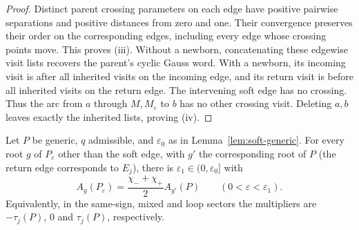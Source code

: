 \begin{proof}
Distinct parent crossing parameters on each edge have positive
pairwise separations and positive distances from zero and one.
Their convergence preserves their order on the corresponding
edges, including every edge whose crossing points move.
This proves (iii). Without a newborn, concatenating these
edgewise visit lists recovers the parent's cyclic Gauss word.
With a newborn, its incoming visit is after all inherited visits
on the incoming edge, and its return visit is before all inherited
visits on the return edge. The intervening soft edge has no crossing.
Thus the arc from $a$ through $M,M_\varepsilon$ to $b$ has no
other crossing visit. Deleting $a,b$ leaves exactly the inherited
lists, proving (iv).
\end{proof}

\begin{theorem}\label{thm:A-soft}\leanok
Let $P$ be generic, $q$ admissible, and $\varepsilon_0$ as in
Lemma~\ref{lem:soft-generic}. For every root $g$ of $P_\varepsilon$ other than
the soft edge, with $g'$ the corresponding root of $P$ (the return edge
corresponds to $E_j$), there is $\varepsilon_1\in(0,\varepsilon_0]$ with
\begin{equation}\label{aspr:soft-law}
A_g(P_\varepsilon)=\frac{\chi_-+\chi_+}{2}A_{g'}(P)
\qquad(0<\varepsilon<\varepsilon_1).
\end{equation}
Equivalently, in the same-sign, mixed and loop sectors the multipliers are
$-\tau_j(P)$, $0$ and $\tau_j(P)$, respectively.

\end{theorem}
